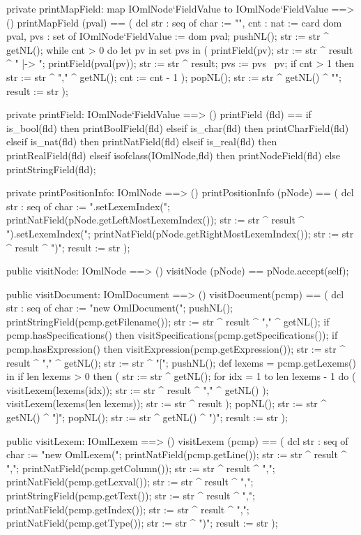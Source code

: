 \begin{vdm_al}
  private printMapField: map IOmlNode`FieldValue to IOmlNode`FieldValue ==> ()
  printMapField (pval) == 
    ( dcl str : seq of char := "{", cnt : nat := card dom pval,
          pvs : set of IOmlNode`FieldValue := dom pval;
      pushNL();
      str := str ^ getNL();
      while cnt > 0 do
        let pv in set pvs in
          ( printField(pv);
            str := str ^ result ^ " |-> ";
            printField(pval(pv));
            str := str ^ result;
            pvs := pvs \ {pv};
            if cnt > 1
            then str := str ^ "," ^ getNL();
            cnt := cnt - 1 ); 
      popNL();
      str := str ^ getNL() ^ "}";
      result := str );

  private printField: IOmlNode`FieldValue ==> ()
  printField (fld) ==
    if is_bool(fld) then printBoolField(fld)
    elseif is_char(fld) then printCharField(fld)
    elseif is_nat(fld) then printNatField(fld)
    elseif is_real(fld) then printRealField(fld)
    elseif isofclass(IOmlNode,fld) then printNodeField(fld)
    else printStringField(fld);

  private printPositionInfo: IOmlNode ==> ()
  printPositionInfo (pNode) ==
    ( dcl str : seq of char := ".setLexemIndex(";
      printNatField(pNode.getLeftMostLexemIndex());
      str := str ^ result ^ ").setLexemIndex(";
      printNatField(pNode.getRightMostLexemIndex());
      str := str ^ result ^ ")";
      result := str );

  public visitNode: IOmlNode ==> ()
  visitNode (pNode) == pNode.accept(self);

  public visitDocument: IOmlDocument ==> ()
  visitDocument(pcmp) ==
    ( dcl str : seq of char := "new OmlDocument(";
      pushNL();
      printStringField(pcmp.getFilename());
      str := str ^ result ^ "," ^ getNL();
      if pcmp.hasSpecifications() then visitSpecifications(pcmp.getSpecifications());
      if pcmp.hasExpression() then visitExpression(pcmp.getExpression());
      str := str ^ result ^ "," ^ getNL();
      str := str ^ "[";
      pushNL();
      def lexems = pcmp.getLexems() in
        if len lexems > 0
        then ( str := str ^ getNL();
               for idx = 1 to len lexems - 1 do
                 ( visitLexem(lexems(idx));
                   str := str ^ result ^ "," ^ getNL() );
               visitLexem(lexems(len lexems));
               str := str ^ result );
      popNL();
      str := str ^ getNL() ^ "]";
      popNL();
      str := str ^ getNL() ^ ")";
      result := str );

  public visitLexem: IOmlLexem ==> ()
  visitLexem (pcmp) ==
    ( dcl str : seq of char := "new OmlLexem(";
      printNatField(pcmp.getLine());
      str := str ^ result ^ ",";
      printNatField(pcmp.getColumn());
      str := str ^ result ^ ",";
      printNatField(pcmp.getLexval());
      str := str ^ result ^ ",";
      printStringField(pcmp.getText());
      str := str ^ result ^ ",";
      printNatField(pcmp.getIndex());
      str := str ^ result ^ ",";
      printNatField(pcmp.getType());
      str := str ^ ")";
      result := str );


\end{vdm_al}
